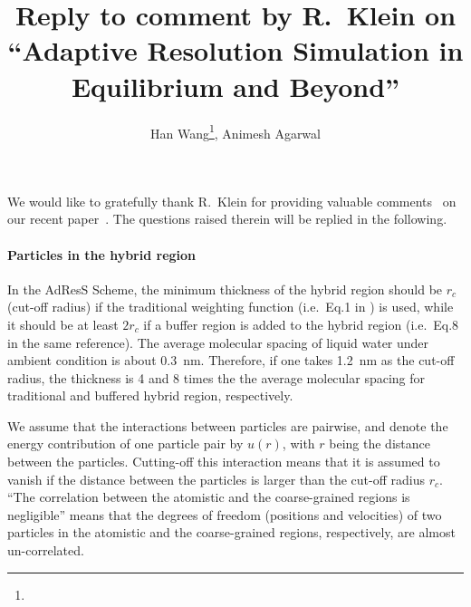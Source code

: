 \documentclass[epjST]{svjour}
\begin{document}
%
\title{Reply to comment by R.~Klein on ``Adaptive Resolution Simulation in Equilibrium and Beyond''}
\author{Han Wang\fnmsep\thanks{}, Animesh Agarwal}
%
%
%
\maketitle
%

We would like to gratefully
thank R.~Klein for providing valuable comments~\cite{klein2015comment}
on our recent paper~\cite{wang2015adaptive}. 
The questions raised therein will be replied in the following. 

\paragraph{Particles in the hybrid region}
In the AdResS Scheme, the minimum thickness of the hybrid region
should be $r_c$ (cut-off radius) if the traditional weighting function
(i.e.~Eq.1 in \cite{wang2015adaptive}) is used, while it should be at least
$2r_c$ if a buffer region  is added to the hybrid
region (i.e.~Eq.8 in the same reference).
The average molecular spacing of liquid water under ambient
condition is about 0.3~nm. Therefore, if one takes 1.2~nm as the cut-off
radius, the thickness is 4 and 8 times the
the average molecular spacing for traditional and buffered hybrid region, respectively.

We assume that the interactions between particles are pairwise, and denote
the energy contribution of one particle pair by $u(r)$, with $r$ being the distance
between the particles. Cutting-off this interaction means that it is assumed to vanish
if the distance between the particles is larger than the cut-off radius $r_c$.
``The correlation between the atomistic and the coarse-grained
regions is negligible'' means that the
degrees of freedom (positions and velocities) of two particles
in the atomistic and the coarse-grained regions, respectively, are almost un-correlated.
\end{document}
